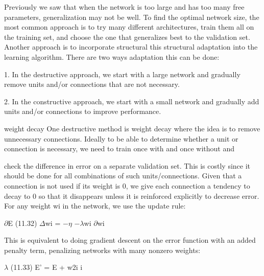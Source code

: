 Previously we saw that when the network is too large and has too many free parameters, generalization may not be well. To find the optimal network size, the most common approach is to try many different architectures, train them all on the training set, and choose the one that generalizes best to the validation set. Another approach is to incorporate structural this structural adaptation into the learning algorithm. There are two ways adaptation this can be done:

1. In the destructive approach, we start with a large network and gradually remove units and/or connections that are not necessary.

2. In the constructive approach, we start with a small network and gradually add units and/or connections to improve performance.

weight decay One destructive method is weight decay where the idea is to remove unnecessary connections. Ideally to be able to determine whether a unit or connection is necessary, we need to train once with and once without and

check the difference in error on a separate validation set. This is costly since it should be done for all combinations of such units/connections. Given that a connection is not used if its weight is 0, we give each connection a tendency to decay to 0 so that it disappears unless it is reinforced explicitly to decrease error. For any weight wi in the network, we use the update rule:

$\partial$E (11.32) $\Delta$wi = $-$$\eta$ $-$$\lambda$wi $\partial$wi

This is equivalent to doing gradient descent on the error function with an added penalty term, penalizing networks with many nonzero weights:

$\lambda$ (11.33) E' = E + w2i i

